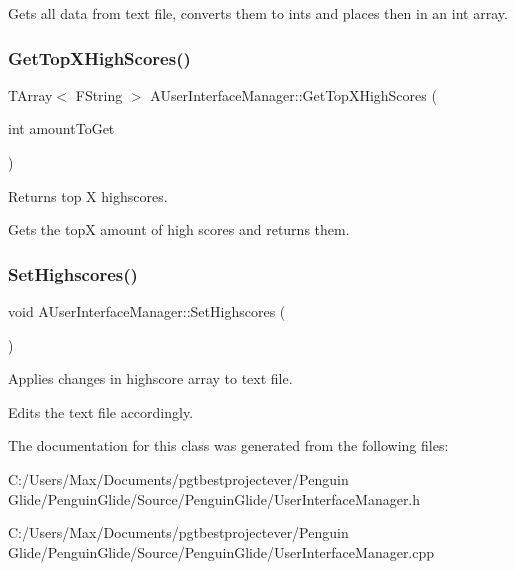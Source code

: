Gets all data from text file, converts them to ints and places then in an int array. \mbox{\label{class_a_user_interface_manager_a10887916bdb9f032b3e9b0782a2326a5}} 
\subsubsection{\texorpdfstring{GetTopXHighScores()}{GetTopXHighScores()}}
{\footnotesize\ttfamily T\+Array$<$ F\+String $>$ A\+User\+Interface\+Manager\+::\+Get\+Top\+X\+High\+Scores (\begin{DoxyParamCaption}\item[{int}]{amount\+To\+Get }\end{DoxyParamCaption})}



Returns top X highscores. 

Gets the topX amount of high scores and returns them. \mbox{\label{class_a_user_interface_manager_a7d590e3c68674c78cce8f0af9a787504}} 
\subsubsection{\texorpdfstring{SetHighscores()}{SetHighscores()}}
{\footnotesize\ttfamily void A\+User\+Interface\+Manager\+::\+Set\+Highscores (\begin{DoxyParamCaption}{ }\end{DoxyParamCaption})}



Applies changes in highscore array to text file. 

Edits the text file accordingly. 

The documentation for this class was generated from the following files\+:\begin{DoxyCompactItemize}
\item 
C\+:/\+Users/\+Max/\+Documents/pgtbestprojectever/\+Penguin Glide/\+Penguin\+Glide/\+Source/\+Penguin\+Glide/User\+Interface\+Manager.\+h\item 
C\+:/\+Users/\+Max/\+Documents/pgtbestprojectever/\+Penguin Glide/\+Penguin\+Glide/\+Source/\+Penguin\+Glide/User\+Interface\+Manager.\+cpp\end{DoxyCompactItemize}
